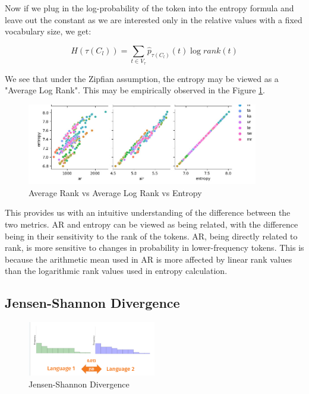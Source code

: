 Now if we plug in the log-probability of the token into the entropy formula and leave out the constant as we are interested only in the relative values with a fixed vocabulary size, we get:

\begin{equation}
    H(\tau(C_l)) = \sum_{t \in V_\tau} \hat{p}_{\tau(C_l)}(t) \log rank(t)
\end{equation}

We see that under the Zipfian assumption, the entropy may be viewed as a "Average Log Rank". This may be empirically observed in the Figure \ref{fig:ar_alr_entropy}.

\begin{figure}
    \centering
    \includegraphics[width=0.9\textwidth]{img/temp/ar_alr_entropy.jpg}
    \caption{Average Rank vs Average Log Rank vs Entropy}
    \label{fig:ar_alr_entropy}
\end{figure}

This provides us with an intuitive understanding of the difference between the two metrics. AR and entropy can be viewed as being related, with the difference being in their sensitivity to the rank of the tokens. AR, being directly related to rank, is more sensitive to changes in probability in lower-frequency tokens. This is because the arithmetic mean used in AR is more affected by linear rank values than the logarithmic rank values used in entropy calculation.

\subsection{Jensen-Shannon Divergence}

\begin{figure}[h]
    \centering
    \includegraphics[width=0.5\textwidth]{img/temp/jsd_example.png}
    \caption{Jensen-Shannon Divergence}
    \label{fig:jsd_example}
\end{figure}

